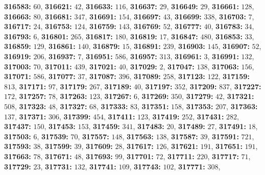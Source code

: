 \textsf{\bfseries 316583:} $60$, \textsf{\bfseries 316621:} $42$, \textsf{\bfseries 316633:} $116$, \textsf{\bfseries 316637:} $29$, \textsf{\bfseries 316649:} $29$, \textsf{\bfseries 316661:} $128$, \textsf{\bfseries 316663:} $80$, \textsf{\bfseries 316681:} $347$, \textsf{\bfseries 316691:} $154$, \textsf{\bfseries 316697:} $43$, \textsf{\bfseries 316699:} $338$, \textsf{\bfseries 316703:} $7$, \textsf{\bfseries 316717:} $24$, \textsf{\bfseries 316753:} $124$, \textsf{\bfseries 316759:} $143$, \textsf{\bfseries 316769:} $52$, \textsf{\bfseries 316777:} $40$, \textsf{\bfseries 316783:} $34$, \textsf{\bfseries 316793:} $6$, \textsf{\bfseries 316801:} $265$, \textsf{\bfseries 316817:} $180$, \textsf{\bfseries 316819:} $17$, \textsf{\bfseries 316847:} $480$, \textsf{\bfseries 316853:} $33$, \textsf{\bfseries 316859:} $129$, \textsf{\bfseries 316861:} $140$, \textsf{\bfseries 316879:} $15$, \textsf{\bfseries 316891:} $239$, \textsf{\bfseries 316903:} $145$, \textsf{\bfseries 316907:} $52$, \textsf{\bfseries 316919:} $206$, \textsf{\bfseries 316937:} $7$, \textsf{\bfseries 316951:} $586$, \textsf{\bfseries 316957:} $313$, \textsf{\bfseries 316961:} $3$, \textsf{\bfseries 316991:} $132$, \textsf{\bfseries 317003:} $70$, \textsf{\bfseries 317011:} $439$, \textsf{\bfseries 317021:} $40$, \textsf{\bfseries 317029:} $2$, \textsf{\bfseries 317047:} $138$, \textsf{\bfseries 317063:} $156$, \textsf{\bfseries 317071:} $586$, \textsf{\bfseries 317077:} $37$, \textsf{\bfseries 317087:} $396$, \textsf{\bfseries 317089:} $258$, \textsf{\bfseries 317123:} $122$, \textsf{\bfseries 317159:} $813$, \textsf{\bfseries 317171:} $97$, \textsf{\bfseries 317179:} $267$, \textsf{\bfseries 317189:} $40$, \textsf{\bfseries 317197:} $352$, \textsf{\bfseries 317209:} $837$, \textsf{\bfseries 317227:} $172$, \textsf{\bfseries 317257:} $78$, \textsf{\bfseries 317263:} $123$, \textsf{\bfseries 317267:} $6$, \textsf{\bfseries 317269:} $350$, \textsf{\bfseries 317279:} $42$, \textsf{\bfseries 317321:} $508$, \textsf{\bfseries 317323:} $48$, \textsf{\bfseries 317327:} $68$, \textsf{\bfseries 317333:} $83$, \textsf{\bfseries 317351:} $158$, \textsf{\bfseries 317353:} $207$, \textsf{\bfseries 317363:} $137$, \textsf{\bfseries 317371:} $306$, \textsf{\bfseries 317399:} $454$, \textsf{\bfseries 317411:} $123$, \textsf{\bfseries 317419:} $252$, \textsf{\bfseries 317431:} $282$, \textsf{\bfseries 317437:} $150$, \textsf{\bfseries 317453:} $153$, \textsf{\bfseries 317459:} $341$, \textsf{\bfseries 317483:} $20$, \textsf{\bfseries 317489:} $27$, \textsf{\bfseries 317491:} $18$, \textsf{\bfseries 317503:} $6$, \textsf{\bfseries 317539:} $70$, \textsf{\bfseries 317557:} $148$, \textsf{\bfseries 317563:} $138$, \textsf{\bfseries 317587:} $39$, \textsf{\bfseries 317591:} $721$, \textsf{\bfseries 317593:} $38$, \textsf{\bfseries 317599:} $39$, \textsf{\bfseries 317609:} $28$, \textsf{\bfseries 317617:} $126$, \textsf{\bfseries 317621:} $191$, \textsf{\bfseries 317651:} $191$, \textsf{\bfseries 317663:} $78$, \textsf{\bfseries 317671:} $48$, \textsf{\bfseries 317693:} $99$, \textsf{\bfseries 317701:} $72$, \textsf{\bfseries 317711:} $220$, \textsf{\bfseries 317717:} $71$, \textsf{\bfseries 317729:} $23$, \textsf{\bfseries 317731:} $132$, \textsf{\bfseries 317741:} $109$, \textsf{\bfseries 317743:} $102$, \textsf{\bfseries 317771:} $308$, 
